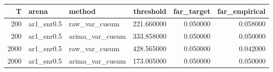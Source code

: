 \begin{tabular}{rllrrr}
\toprule
T & arena & method & threshold & far_target & far_empirical \\
\midrule
200 & ar1_snr0.5 & raw_var_cusum & 221.660000 & 0.050000 & 0.058000 \\
200 & ar1_snr0.5 & arima_var_cusum & 333.858000 & 0.050000 & 0.050000 \\
2000 & ar1_snr0.5 & raw_var_cusum & 428.565000 & 0.050000 & 0.042000 \\
2000 & ar1_snr0.5 & arima_var_cusum & 173.005000 & 0.050000 & 0.050000 \\
\bottomrule
\end{tabular}
